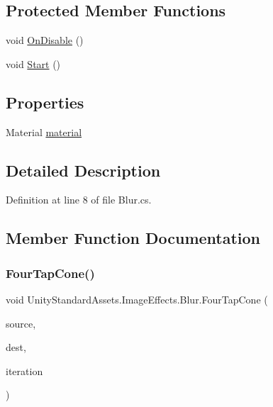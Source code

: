 \subsection*{Protected Member Functions}
\begin{DoxyCompactItemize}
\item 
void \mbox{\hyperlink{class_unity_standard_assets_1_1_image_effects_1_1_blur_a24ec2c70937612fb12e198f8594ef198}{On\+Disable}} ()
\item 
void \mbox{\hyperlink{class_unity_standard_assets_1_1_image_effects_1_1_blur_a7f252bb396ba1fa98a6daa639d9196dc}{Start}} ()
\end{DoxyCompactItemize}
\subsection*{Properties}
\begin{DoxyCompactItemize}
\item 
Material \mbox{\hyperlink{class_unity_standard_assets_1_1_image_effects_1_1_blur_aa9a1c99d318055ed40e44b47189e3980}{material}}
\end{DoxyCompactItemize}


\subsection{Detailed Description}


Definition at line 8 of file Blur.\+cs.



\subsection{Member Function Documentation}
\mbox{\label{class_unity_standard_assets_1_1_image_effects_1_1_blur_a26bb3f789097c645ad578c94c80fbb2b}} 
\subsubsection{\texorpdfstring{Four\+Tap\+Cone()}{FourTapCone()}}
{\footnotesize\ttfamily void Unity\+Standard\+Assets.\+Image\+Effects.\+Blur.\+Four\+Tap\+Cone (\begin{DoxyParamCaption}\item[{Render\+Texture}]{source,  }\item[{Render\+Texture}]{dest,  }\item[{int}]{iteration }\end{DoxyParamCaption})}



